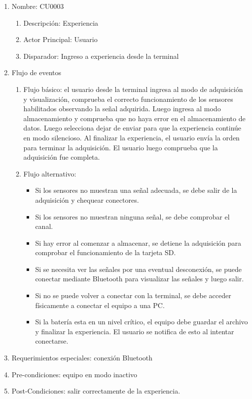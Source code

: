 	\begin{enumerate} 
		\item Nombre: CU0003
		\begin{enumerate} [label*=\arabic*.]
			\item Descripción: Experiencia
			\item Actor Principal: Usuario
			\item Disparador: Ingreso a experiencia desde la terminal
		\end{enumerate}
		\item Flujo de eventos
		\begin{enumerate} [label*=\arabic*.]
			\item Flujo básico: el usuario desde la terminal ingresa al modo de adquisición y visualización, comprueba el correcto funcionamiento de los sensores habilitados observando la señal adquirida. Luego ingresa al modo almacenamiento y comprueba que no haya error en el almacenamiento de datos. Luego selecciona dejar de enviar para que la experiencia continúe en modo silencioso. Al finalizar la experiencia, el usuario envía la orden para terminar la adquisición. El usuario luego comprueba que la adquisición fue completa.
			\item Flujo alternativo:
			\begin{itemize}
				\item Si los sensores no muestran una señal adecuada, se debe salir de la adquisición y chequear conectores.
				\item Si los sensores no muestran ninguna señal, se debe comprobar el canal.
				\item Si hay error al comenzar a almacenar, se detiene la adquisición para comprobar el funcionamiento de la tarjeta SD.
				\item Si se necesita ver las señales por una eventual desconexión, se puede conectar mediante Bluetooth para visualizar las señales y luego salir. 
				\item Si no se puede volver a conectar con la terminal, se debe acceder físicamente a conectar el equipo a una PC.
				\item Si la batería esta en un nivel crítico, el equipo debe guardar el archivo y finalizar la experiencia. El usuario se notifica de esto al intentar conectarse.					
			\end{itemize}				
		\end{enumerate}

		\item Requerimientos especiales: conexión Bluetooth
		\item Pre-condiciones: equipo en modo inactivo
		\item Post-Condiciones: salir correctamente de la experiencia.
	\end{enumerate}


